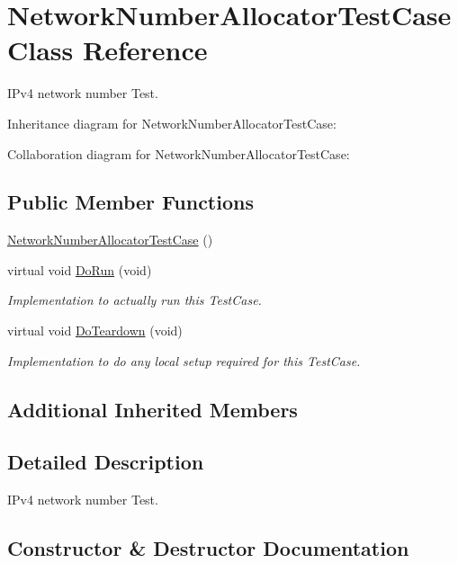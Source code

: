 \hypertarget{classNetworkNumberAllocatorTestCase}{}\section{Network\+Number\+Allocator\+Test\+Case Class Reference}
\label{classNetworkNumberAllocatorTestCase}


I\+Pv4 network number Test.  




Inheritance diagram for Network\+Number\+Allocator\+Test\+Case\+:


Collaboration diagram for Network\+Number\+Allocator\+Test\+Case\+:
\subsection*{Public Member Functions}
\begin{DoxyCompactItemize}
\item 
\hyperlink{classNetworkNumberAllocatorTestCase_a7a13d9c6e2a17af97402dc246114caaa}{Network\+Number\+Allocator\+Test\+Case} ()
\item 
virtual void \hyperlink{classNetworkNumberAllocatorTestCase_a85100fbfe328f2eb43b3dd959926cbc0}{Do\+Run} (void)
\begin{DoxyCompactList}\small\item\em Implementation to actually run this Test\+Case. \end{DoxyCompactList}\item 
virtual void \hyperlink{classNetworkNumberAllocatorTestCase_a078c6ba36a63f866b595b1491dbf1564}{Do\+Teardown} (void)
\begin{DoxyCompactList}\small\item\em Implementation to do any local setup required for this Test\+Case. \end{DoxyCompactList}\end{DoxyCompactItemize}
\subsection*{Additional Inherited Members}


\subsection{Detailed Description}
I\+Pv4 network number Test. 

\subsection{Constructor \& Destructor Documentation}
